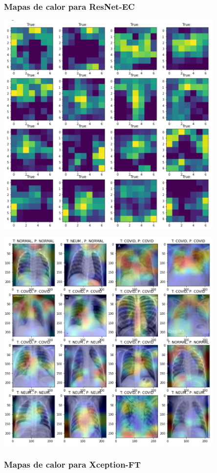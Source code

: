 \documentclass[11pt,a4paper]{article}
\theoremstyle{definition}
\begin{document}
\subsubsection{Mapas de calor para ResNet-EC}

\includegraphics[width=0.85\textwidth]{./images/resnetfilters}

\includegraphics[width=0.85\textwidth]{./images/resnetheatmap}

\subsubsection{Mapas de calor para Xception-FT}
\end{document}
